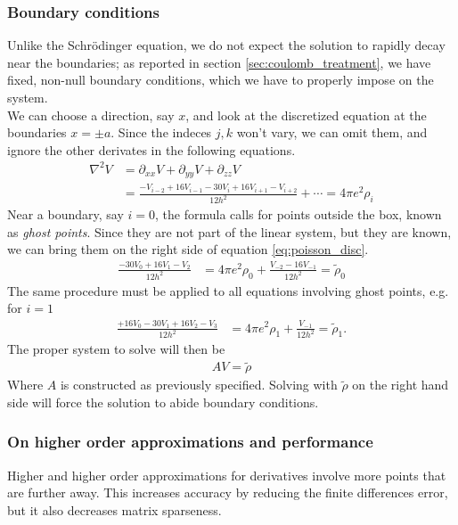 \subsubsection{Boundary conditions}
Unlike the Schr\"odinger equation, we do not expect the solution to rapidly decay near the boundaries; as reported in section \ref{sec:coulomb_treatment}, we have fixed, non-null boundary conditions, which we have to properly impose on the system.
\\We can choose a direction, say $x$, and look at the discretized equation at the boundaries $x=\pm a$. Since the indeces $j,k$ won't vary, we can omit them, and ignore the other derivates in the following equations.
\begin{align}
    \label{eq:poisson_disc}
    \nabla^2 V &= \partial_{xx} V + \partial_{yy}V + \partial_{zz}V\nonumber \\
    &= \frac{-V_{i-2} + 16V_{i-1} -30V_i + 16V_{i+1} - V_{i+2}}{12h^2}+\cdots=4\pi e^2 \rho_i
\end{align}
Near a boundary, say $i = 0$, the formula calls for points outside the box, known as \textit{ghost points}. Since they are not part of the linear system, but they are known, we can bring them on the right side of equation \ref{eq:poisson_disc}.
\begin{align}
    \frac{-30 V_0 + 16 V_1 - V_2 }{12h^2} &= 4\pi e^2 \rho_0 +\frac{ V_{-2} -16V_{-1}}{12h^2} = \tilde\rho_0
\end{align}
The same procedure must be applied to all equations involving ghost points, e.g. for $i=1$
\begin{align}
    \frac{+16V_0 -30V_{1} + 16 V_2 - V_3}{12h^2} &= 4\pi e^2 \rho_1 + \frac{V_{-1} }{12h^2} = \tilde\rho_1.
\end{align}
The proper system to solve will then be
\begin{align}
A V = \tilde \rho
\end{align}
Where $A$ is constructed as previously specified. Solving with $\tilde \rho $ on the right hand side will force the solution to abide boundary conditions.
\subsubsection{On higher order approximations and performance}
Higher and higher order approximations for derivatives involve more points that are further away. This increases accuracy by reducing the finite differences error, but it also decreases matrix sparseness.